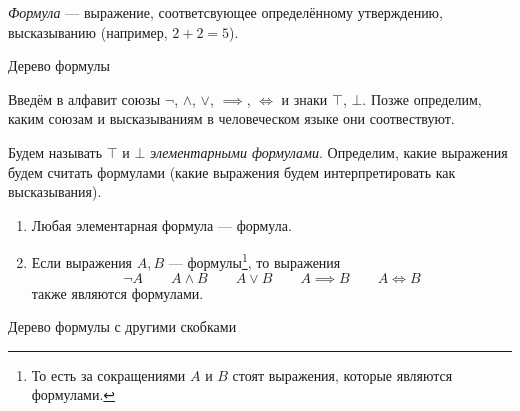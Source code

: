   {\it Формула} --- выражение,
соответсвующее определённому утверждению, высказыванию
(например, $2+2=5$).
\begin{marginfigure}[3.5cm]
  \centering

  \caption{Дерево формулы}\label{fig:form_tree}
\end{marginfigure}

Введём в алфавит союзы $\lnot$, $\land$, $\lor$, $\implies$, $\iff$
и знаки $\top$, $\bot$.
Позже определим, каким союзам и высказываниям в человеческом
языке они соотвествуют.

Будем называть $\top$ и $\bot$ {\it элементарными формулами}.
Определим, какие выражения будем считать формулами (какие выражения
будем интерпретировать как высказывания).
\begin{enumerate}
  \item{}Любая элементарная формула --- формула.

  \item{}Если выражения $A,B$ --- формулы\footnote{То есть за
    сокращениями $A$ и $B$ стоят выражения, которые являются
    формулами.}, то выражения
  \begin{equation}\label{eq:comp_formulas}
    \lnot A\qquad A\land B\qquad A\lor B\qquad A\implies B\qquad A\iff B
  \end{equation}
  также являются формулами.
\end{enumerate}

\begin{marginfigure}[0.75cm]
  \centering

  \caption{Дерево формулы с другими скобками}\label{fig:form_tree_2}
\end{marginfigure}

